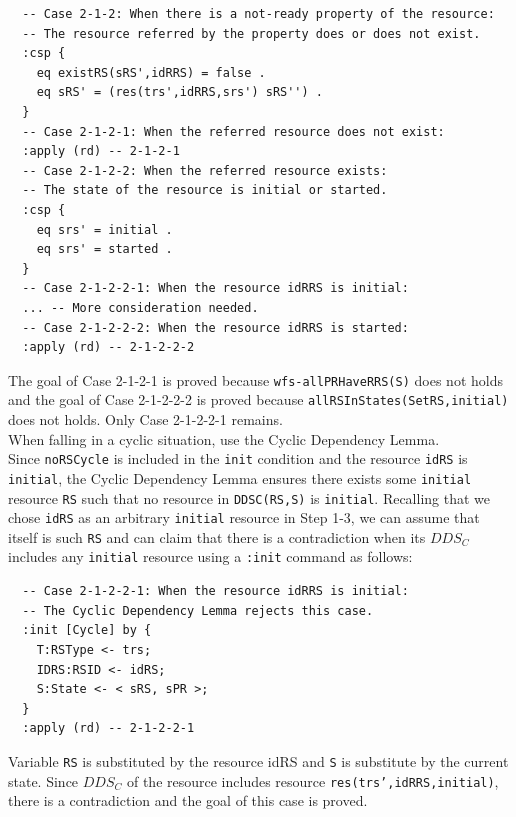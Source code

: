 \documentclass[12pt]{report}
\newcommand{\stt}[1]{{\small{\tt {#1}}}}
\begin{document}
\small
\begin{verbatim}
  -- Case 2-1-2: When there is a not-ready property of the resource:
  -- The resource referred by the property does or does not exist.
  :csp {
    eq existRS(sRS',idRRS) = false .
    eq sRS' = (res(trs',idRRS,srs') sRS'') .
  }
  -- Case 2-1-2-1: When the referred resource does not exist:
  :apply (rd) -- 2-1-2-1
  -- Case 2-1-2-2: When the referred resource exists:
  -- The state of the resource is initial or started.
  :csp { 
    eq srs' = initial .
    eq srs' = started .
  }
  -- Case 2-1-2-2-1: When the resource idRRS is initial:
  ... -- More consideration needed.
  -- Case 2-1-2-2-2: When the resource idRRS is started:
  :apply (rd) -- 2-1-2-2-2
\end{verbatim}
\normalsize
The goal of Case 2-1-2-1 is proved because \stt{wfs-allPRHaveRRS(S)}
does not holds and the goal of Case 2-1-2-2-2 is proved because
\stt{allRSInStates(SetRS,initial)} does not holds.  Only Case
2-1-2-2-1 remains.\\

 When falling in a cyclic situation, use the
Cyclic Dependency Lemma. \\
Since {\tt noRSCycle} is included in the {\tt init} condition and the
resource {\tt idRS} is {\tt initial}, the Cyclic Dependency Lemma
ensures there exists some {\tt initial} resource {\tt RS} such that no
resource in \stt{DDSC(RS,S)} is {\tt initial}. Recalling that we chose
{\tt idRS} as an arbitrary {\tt initial} resource in Step 1-3, we can
assume that itself is such {\tt RS} and can claim that there is a
contradiction when its $DDS_C$ includes any {\tt initial} resource
using a {\tt :init} command as follows:
\small
\begin{verbatim}
  -- Case 2-1-2-2-1: When the resource idRRS is initial:
  -- The Cyclic Dependency Lemma rejects this case.
  :init [Cycle] by {
    T:RSType <- trs;
    IDRS:RSID <- idRS;
    S:State <- < sRS, sPR >;
  }
  :apply (rd) -- 2-1-2-2-1
\end{verbatim}
\normalsize
Variable {\tt RS} is substituted by the resource idRS and {\tt S} is
substitute by the current state. Since $DDS_C$ of the resource
includes resource \stt{res(trs',idRRS,initial)}, there is a
contradiction and the goal of this case is proved.
\end{document}
